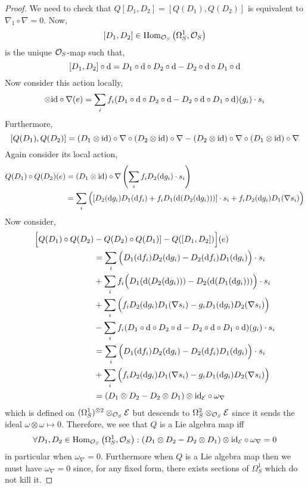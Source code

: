 \documentclass[12pt]{article}
\begin{document}
\begin{proof}
We need to check that $Q[D_1, D_2] = [Q(D_1), Q(D_2)]$ is equivalent to $\nabla_1 \circ \nabla = 0$. Now,
\[ [D_1, D_2] \in \mathrm{Hom}_{\mathcal{O}_{S}} \left( \Omega^1_S, \mathcal{O}_{S} \right) \]
is the unique $\mathcal{O}_{S}$-map such that,
\[ [D_1, D_2] \circ \mathrm{d} = D_1 \circ \mathrm{d} \circ D_2 \circ \mathrm{d} - D_2 \circ \mathrm{d} \circ D_1 \circ \mathrm{d} \]
Now consider this action locally,
\begin{align*}
[D_1, D_2] \otimes \id \circ \nabla(e) = \sum_i f_i (D_1 \circ \d \circ D_2 \circ \d - D_2 \circ \d \circ D_1 \circ \d)(g_i) \cdot s_i 
\end{align*}
Furthermore, 
\[ [Q(D_1), Q(D_2)] = (D_1 \otimes \mathrm{id}) \circ \nabla \circ (D_2 \otimes \mathrm{id}) \circ \nabla - (D_2 \otimes \mathrm{id}) \circ \nabla \circ (D_1 \otimes \mathrm{id}) \circ \nabla \]
Again consider its local action,
\begin{align*}
Q(D_1) \circ  Q(D_2)(e) & = (D_1 \otimes \mathrm{id}) \circ \nabla \left( \sum_i f_i D_2(\mathrm{d}{g_i}) \cdot s_i \right) 
\\
& = \sum_i \Big( [D_2(\mathrm{d}{g_i}) D_1(\mathrm{d}{f_i}) + f_i D_1(\mathrm{d}{(D_2(\mathrm{d}{g_i}))}) ] \cdot s_i + f_i D_2(\mathrm{d}{g_i}) D_1( \nabla s_i ) \Big)
\end{align*}
Now consider,
\begin{align*}
\Big[ Q(D_1) \circ Q(D_2) & - Q(D_2) \circ Q(D_1)] - Q([D_1, D_2]) \Big](e)
\\
& = \sum_i \Big( D_1(\mathrm{d}{f_i}) D_2(\mathrm{d}{g_i}) - D_2(\mathrm{d}{f_i}) D_1(\mathrm{d}{g_i})  \Big) \cdot s_i
\\
& + \sum_i f_i \Big(D_1(\mathrm{d}{(D_2(\mathrm{d}{g_i}))}) - D_2(\mathrm{d}{(D_1(\mathrm{d}{g_i}))}) \Big) \cdot s_i
\\
& +  \sum_i  \Big( f_i D_2(\mathrm{d}{g_i}) D_1(\nabla s_i) - g_i D_1(\mathrm{d}{g_i}) D_2(\nabla s_i) \Big)
\\
& - \sum_i f_i (D_1 \circ \mathrm{d} \circ D_2 \circ \mathrm{d} - D_2 \circ \mathrm{d} \circ D_1 \circ \mathrm{d})(g_i) \cdot s_i
\\
& = \sum_i \Big( D_1(\mathrm{d}{f_i}) D_2(\mathrm{d}{g_i}) - D_2(\mathrm{d}{f_i}) D_1(\mathrm{d}{g_i})  \Big) \cdot s_i 
\\
& +  \sum_i  \Big( f_i D_2(\mathrm{d}{g_i}) D_1(\nabla s_i) - g_i D_1(\mathrm{d}{g_i}) D_2(\nabla s_i) \Big)
\\
& = (D_1 \otimes D_2 - D_2 \otimes D_1) \otimes \mathrm{id}_{\mathcal{E}} \circ \omega_\nabla 
\end{align*}
which is defined on $(\Omega^1_S)^{\otimes 2} \otimes_{\mathcal{O}_{S}} \mathcal{E}$ but descends to $\Omega^2_S \otimes_{\mathcal{O}_{S}} \mathcal{E}$ since it sends the ideal $\omega \otimes \omega \mapsto 0$. Therefore, we see that $Q$ is a Lie algebra map iff
\[ \forall D_1, D_2 \in \mathrm{Hom}_{\mathcal{O}_{S}} \left( \Omega^1_S, \mathcal{O}_{S} \right) : (D_1 \otimes D_2 - D_2 \otimes D_1) \otimes \mathrm{id}_{\mathcal{E}} \circ \omega_\nabla = 0 \]
in particular when $\omega_\nabla = 0$. Furthermore when $Q$ is a Lie algebra map then we must have $\omega_\nabla = 0$ since, for any fixed form, there exists sections of $\Omega^1_S$ which do not kill it. 
\end{proof}
\end{document}
